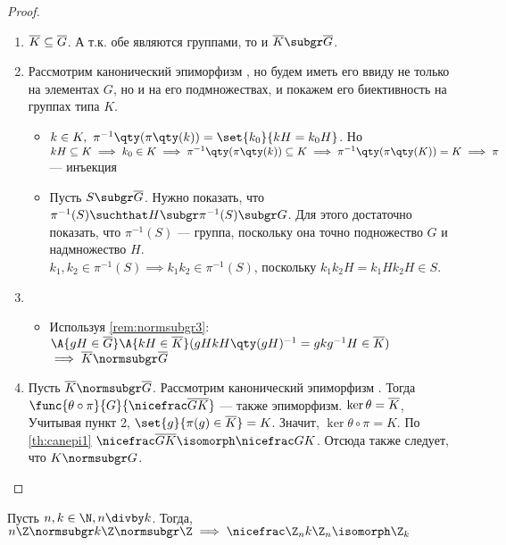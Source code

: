{\begin{proof}
  \theoremlistshack
  \begin{enumerate}
    \item $\factorgr{K}{}\subseteq\factorgr{G}{}$. А т.\:к. обе являются группами, то и $\factorgr{K}{}\subgr \factorgr{G}{}$.
    \item Рассмотрим канонический эпиморфизм , но будем иметь его ввиду не только на элементах $G$, но и на его подмножествах, и покажем его биективность на группах типа $K$.
          \begin{itemize}
            \item[\implies]  $k\in K,\ \pi^{-1}\qty(\pi\qty(k))=\set{k_0}{kH=k_0H}$. Но $kH\subseteq K\implies k_0\in K\implies \pi^{-1}\qty(\pi\qty(k))\subseteq K\implies \pi^{-1}\qty(\pi\qty(K))=K\implies \pi$ --- инъекция
            \item[\impliedby] Пусть $S\subgr \factorgr{G}{}$. Нужно показать, что $\pi^{-1}(S)\suchthat H\subgr \pi^{-1}(S)\subgr G$. Для этого достаточно показать, что  $\pi^{-1}(S)$ --- группа, поскольку она точно подножество $G$ и надмножество $H$.\\
                  $k_1, k_2\in \pi^{-1}(S)\implies k_1k_2\in \pi^{-1}(S)$, поскольку $k_1k_2H=k_1Hk_2H\in S$.
          \end{itemize}
    \item
          \begin{itemize}
            \item[\implies]  Используя \ref{rem:normsubgr3}: \\
                  $\A{gH\in\factorgr{G}{}}\A{kH\in \factorgr{K}{}}(gHkH\qty(gH)^{-1}=gkg^{-1} H\in\factorgr{K}{})$
                  $\implies \factorgr{K}{}\normsubgr \factorgr{G}{}$
          \end{itemize}
    \item Пусть $\factorgr{K}{}\normsubgr \factorgr{G}{}$. Рассмотрим канонический эпиморфизм . Тогда $\func{\theta\circ\pi }{G}{\ffgr{G}{K}}$ --- также эпиморфизм. $\ker\theta=\factorgr{K}{}$, Учитывая пункт 2, $\set{g}{\pi(g)\in \factorgr{K}{}}=K$. Значит, $\ker\theta\circ\pi=K$. По \ref{th:canepi1} $\ffgr{G}{K}\isomorph\factorgr{G}{K}$. Отсюда также следует, что $K\normsubgr G$.
  \end{enumerate}
\end{proof}
}

\begin{example}
  Пусть $n,k\in \N, n\divby k$. Тогда, $n\Z\normsubgr k\Z\normsubgr\Z\implies \factorgr{\Z_n}{k\Z_n}\isomorph \Z_k$
\end{example}

